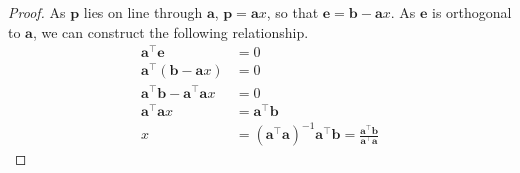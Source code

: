 \documentclass{article}
\begin{document}
\begin{proof}
    As \(\symbf{p}\) lies on line through
    \(\symbf{a}\), \(\symbf{p}=\symbf{a}x\), so that
    \(\symbf{e}=\symbf{b}-\symbf{a}x\). As \(\symbf{e}\) is
    orthogonal to \(\symbf{a}\), we can construct the following
    relationship.
    \begin{align*}
        \symbf{a}^\top \symbf{e}                             & = 0                                                                                                                                \\
        \symbf{a}^\top \left( \symbf{b} - \symbf{a}x \right) & = 0                                                                                                                                \\
        \symbf{a}^\top \symbf{b} - \symbf{a}^\top \symbf{a}x & = 0                                                                                                                                \\
        \symbf{a}^\top \symbf{a}x                            & = \symbf{a}^\top \symbf{b}                                                                                                         \\
        x                                                    & = \left( \symbf{a}^\top \symbf{a} \right)^{-1}\symbf{a}^\top \symbf{b} = \frac{\symbf{a}^\top \symbf{b}}{\symbf{a}^\top \symbf{a}}
    \end{align*}
\end{proof}
\end{document}
